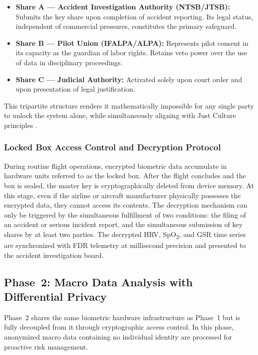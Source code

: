 \documentclass[12pt,a4paper]{article}
\begin{document}
\begin{itemize}[leftmargin=1.5cm]
  \item \textbf{Share A --- Accident Investigation Authority (NTSB/JTSB):} Submits the key
    share upon completion of accident reporting. Its legal status, independent of commercial
    pressures, constitutes the primary safeguard.
  \item \textbf{Share B --- Pilot Union (IFALPA/ALPA):} Represents pilot consent in its
    capacity as the guardian of labor rights. Retains veto power over the use of data in
    disciplinary proceedings.
  \item \textbf{Share C --- Judicial Authority:} Activated solely upon court order and upon
    presentation of legal justification.
\end{itemize}

This tripartite structure renders it mathematically impossible for any single party to unlock
the system alone, while simultaneously aligning with Just Culture principles \citep{dekker2007}.

\subsubsection{Locked Box Access Control and Decryption Protocol}

During routine flight operations, encrypted biometric data accumulate in hardware units referred
to as the locked box. After the flight concludes and the box is sealed, the master key is
cryptographically deleted from device memory. At this stage, even if the airline or aircraft
manufacturer physically possesses the encrypted data, they cannot access its contents. The
decryption mechanism can only be triggered by the simultaneous fulfillment of two conditions:
the filing of an accident or serious incident report, and the simultaneous submission of key
shares by at least two parties. The decrypted HRV, SpO\textsubscript{2}, and GSR time series
are synchronized with FDR telemetry at millisecond precision and presented to the accident
investigation board.

\subsection{Phase~2: Macro Data Analysis with Differential Privacy}

Phase~2 shares the same biometric hardware infrastructure as Phase~1 but is fully decoupled from
it through cryptographic access control. In this phase, anonymized macro data containing no
individual identity are processed for proactive risk management.
\end{document}
